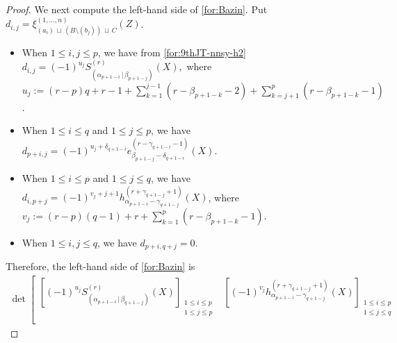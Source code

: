 \documentclass[12pt]{amsart}%
\theoremstyle{definition}
\begin{document}
\begin{proof}
We next compute the left-hand side of \eqref{for:Bazin}.
Put 
$d_{i,j}=\xi^{(1,\ldots,n)}_{(a_{i})\,\sqcup\,(B\setminus (b_j))\,\sqcup\, C}(Z)$.
\begin{itemize}
\item 
When $1\le i,j\le p$, we have from \eqref{for:9thJT-nnsy-h2} $d_{i,j}
=(-1)^{u_j} S^{(r)}_{(\alpha_{p+1-i}\,|\,\beta_{p+1-j})}(X),
$
where $u_{j}:=(r-p)q+r-1
+\sum^{j-1}_{k=1}(r-\beta_{p+1-k}-2)
+\sum^{p}_{k=j+1}(r-\beta_{p+1-k}-1)$.
\item 
When $1\le i\le q$ and $1\le j\le p$,
we have  
$d_{p+i,j}
=(-1)^{u_j+\delta_{q+1-i}}e^{(r-\gamma_{q+1-i}-1)}_{\beta_{p+1-j}-\delta_{q+1-i}}(X)$.
\item 
When $1\le i\le p$ and $1\le j\le q$, we have 
${d_{i,p+j}}
=(-1)^{v_j+j+1}h^{(r+\gamma_{q+1-j}+1)}_{\alpha_{p+1-i}-\gamma_{q+1-j}}(X)$,
where $v_j:=(r-p)(q-1)+r+\sum^{p}_{k=1}(r-\beta_{p+1-k}-1)$.
\item 
When $1\le i,j\le q$, we have $d_{p+i,q+j}=0$.
\end{itemize}
Therefore, the left-hand side of \eqref{for:Bazin} is  
\begin{align*}
\det\left[
\begin{array}{c|c}
\left[(-1)^{u_j}S^{(r)}_{(\alpha_{p+1-i}\,|\,\beta_{q+1-j})}(X)\right]_{\substack{1\le i\le p \\ 1\le j\le p}} & 
\left[(-1)^{v_j}h^{(r+\gamma_{q+1-j}+1)}_{\alpha_{p+1-i}-\gamma_{q+1-j}}(X)\right]_{\substack{1\le i\le p \\ 1\le j\le q}} \\[10pt]

\end{array}
\end{align*}
\end{proof}
\end{document}
